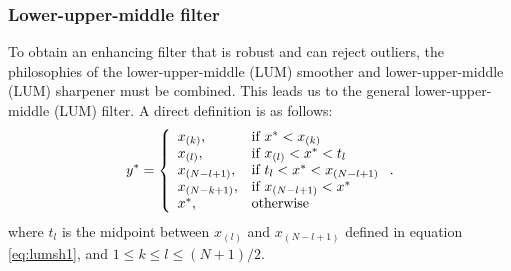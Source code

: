      \subsubsection{Lower-upper-middle filter}

To obtain an enhancing filter that is robust and can reject outliers,
the philosophies of the lower-upper-middle (LUM)
smoother and lower-upper-middle (LUM) sharpener must be
combined. This leads us to the general
lower-upper-middle (LUM) filter. A direct definition is
as follows: 
\begin{equation} 
  y^* = \left\{
\begin{array}{ll} x_{(k)}, & \textrm{if $ x^* < x_{(k)}$}\\ x_{(l)}, &
\textrm{if $ x_{(l)} < x^* < t_l$}\\ x_{(N-l+1)}, & \textrm{if $ t_l <
x^* < x_{(N-l+1)}$}\\ x_{(N-k+1)}, & \textrm{if $ x_{(N-l+1)} <
x^*$}\\ x^*, & \textrm{otherwise}
\end{array} \right..
  \label{eq:lum5} 
\end{equation}
where $t_l$ is the midpoint between $x_{(l)}$ and $x_{(N-l+1)}$
defined in equation
\ref{eq:lumsh1}, and  $1 \le k \le l \le (N+1)/2$.




%

